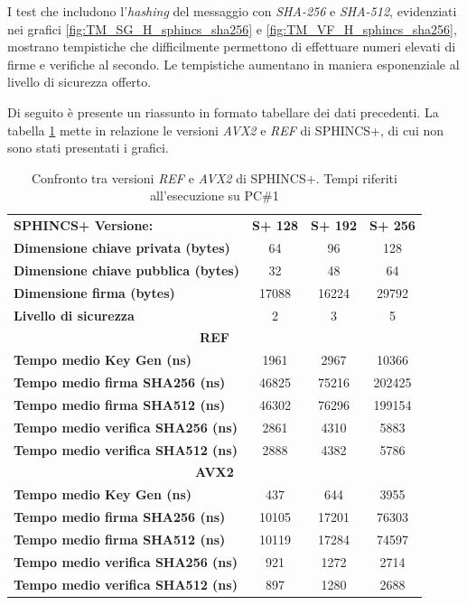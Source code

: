 I test che includono l'\textit{hashing} del messaggio con \textit{SHA-256} e \textit{SHA-512}, evidenziati nei grafici \ref{fig:TM_SG_H_sphincs_sha256} e \ref{fig:TM_VF_H_sphincs_sha256}, mostrano tempistiche che difficilmente permettono di effettuare numeri elevati di firme e verifiche al secondo. Le tempistiche aumentano in maniera esponenziale al livello di sicurezza offerto.

Di seguito è presente un riassunto in formato tabellare dei dati precedenti. La tabella \ref{tab:sphincs_comparison} mette in relazione le versioni \textit{AVX2} e \textit{REF} di SPHINCS+, di cui non sono stati presentati i grafici.

\begin{table}[H]
    \centering
    \begin{tabular}{lccc}
        \toprule
        \textbf{SPHINCS+ Versione:} & \textbf{S+ 128} & \textbf{S+ 192} & \textbf{S+ 256} \\
        \cmidrule(lr){1-4}
        \textbf{Dimensione chiave privata (bytes)} & 64 & 96 & 128 \\
        \textbf{Dimensione chiave pubblica (bytes)} & 32 & 48 & 64 \\
        \textbf{Dimensione firma (bytes)} & 17088 & 16224 & 29792 \\
        \textbf{Livello di sicurezza} & 2 & 3 & 5 \\
        \midrule
        \multicolumn{4}{c}{\textbf{REF}} \\
        \cmidrule(lr){1-4}
        \textbf{Tempo medio Key Gen (ns)} & 1961 & 2967 & 10366 \\
        \textbf{Tempo medio firma SHA256 (ns)} & 46825 & 75216 & 202425 \\
        \textbf{Tempo medio firma SHA512 (ns)} & 46302 & 76296 & 199154 \\
        \textbf{Tempo medio verifica SHA256 (ns)} & 2861 & 4310 & 5883 \\
        \textbf{Tempo medio verifica SHA512 (ns)} & 2888 & 4382 & 5786 \\
        \midrule
        \multicolumn{4}{c}{\textbf{AVX2}} \\
        \cmidrule(lr){1-4}
        \textbf{Tempo medio Key Gen (ns)} & 437 & 644 & 3955 \\
        \textbf{Tempo medio firma SHA256 (ns)} & 10105 & 17201 & 76303 \\
        \textbf{Tempo medio firma SHA512 (ns)} & 10119 & 17284 & 74597 \\
        \textbf{Tempo medio verifica SHA256 (ns)} & 921 & 1272 & 2714 \\
        \textbf{Tempo medio verifica SHA512 (ns)} & 897 & 1280 & 2688 \\
        \bottomrule
    \end{tabular}
    \caption{Confronto tra versioni \textit{REF} e \textit{AVX2} di SPHINCS+. Tempi riferiti all'esecuzione su PC\#1}
    \label{tab:sphincs_comparison}
\end{table}


